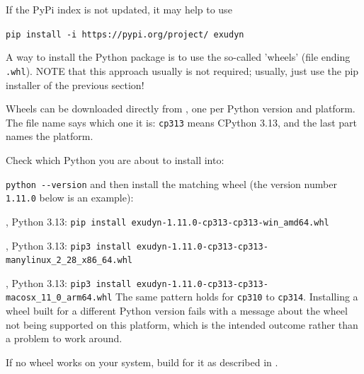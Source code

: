 If the PyPi index is not updated, it may help to use 
\bi 
  \item[] \texttt{pip install -i https://pypi.org/project/ exudyn}
\ei

A way to install the Python package \codeName is to use the so-called 'wheels' (file ending \texttt{.whl}).
NOTE that this approach usually is not required; usually, just use the pip installer of the previous section!

Wheels can be downloaded directly from
, one per
Python version and platform. The file name says which one it is: \texttt{cp313} means CPython 3.13,
and the last part names the platform.

\noindent Check which Python you are about to install into:
\bi
  \item[] \texttt{python -{}-version}
\ei
\noindent and then install the matching wheel (the version number \texttt{1.11.0} below is an
example):
\bi
  \item {}, Python 3.13: \texttt{pip install exudyn-1.11.0-cp313-cp313-win\_amd64.whl}
  \item {}, Python 3.13: \texttt{pip3 install exudyn-1.11.0-cp313-cp313-manylinux\_2\_28\_x86\_64.whl}
  \item {}, Python 3.13: \texttt{pip3 install exudyn-1.11.0-cp313-cp313-macosx\_11\_0\_arm64.whl}
\ei
\noindent The same pattern holds for \texttt{cp310} to \texttt{cp314}. Installing a wheel built
for a different Python version fails with a message about the wheel not being supported on this
platform, which is the intended outcome rather than a problem to work around.

\noindent If no wheel works on your system, build \codeName for it as described in
.
%
%

%

